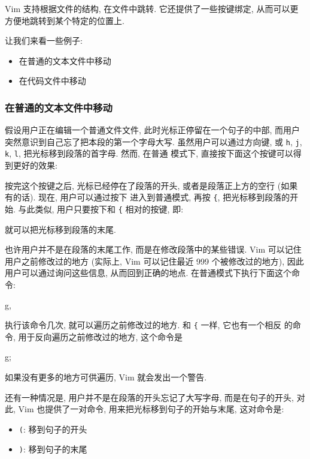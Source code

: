 Vim 支持根据文件的结构, 在文件中跳转. 它还提供了一些按键绑定, 从而可以更
方便地跳转到某个特定的位置上.

让我们来看一些例子:
\begin{itemize}
    \item 在普通的文本文件中移动
    \item 在代码文件中移动
\end{itemize}

\subsubsection{在普通的文本文件中移动}
\label{subsubsec:moving_around_within_a_text_file}

假设用户正在编辑一个普通文件文件, 此时光标正停留在一个句子的中部, 而用户
突然意识到自己忘了把本段的第一个字母大写. 虽然用户可以通过方向键, 或
\texttt{h}, \texttt{j}, \texttt{k}, \texttt{l}, 把光标移到段落的首字母. 然而, 在普通 
模式下, 直接按下面这个按键可以得到更好的效果:
\begin{vimcmd}
{
\end{vimcmd}

按完这个按键之后, 光标已经停在了段落的开头, 或者是段落正上方的空行 (如果 
有的话). 现在, 用户可以通过按下  进入到普通模式, 再按 \texttt{\{},
把光标移到段落的开始. 与此类似, 用户只要按下和 \texttt{\{} 相对的按键, 即:
\begin{vimcmd}
}
\end{vimcmd}
就可以把光标移到段落的末尾.

也许用户并不是在段落的末尾工作, 而是在修改段落中的某些错误. Vim 可以记住
用户之前修改过的地方 (实际上, Vim 可以记住最近 999 个被修改过的地方), 因此
用户可以通过询问这些信息, 从而回到正确的地点. 在普通模式下执行下面这个命令:
\begin{vimcmd}
g,
\end{vimcmd}
执行该命令几次, 就可以遍历之前修改过的地方. 和 \texttt{\{} 一样, 它也有一个相反
的命令, 用于反向遍历之前修改过的地方, 这个命令是
\begin{vimcmd}
g;
\end{vimcmd}
如果没有更多的地方可供遍历, Vim 就会发出一个警告.

还有一种情况是, 用户并不是在段落的开头忘记了大写字母, 而是在句子的开头, 对此,
Vim 也提供了一对命令, 用来把光标移到句子的开始与末尾, 这对命令是:
\begin{itemize}
    \item \texttt{(}: 移到句子的开头
    \item \texttt{)}: 移到句子的末尾
\end{itemize}

